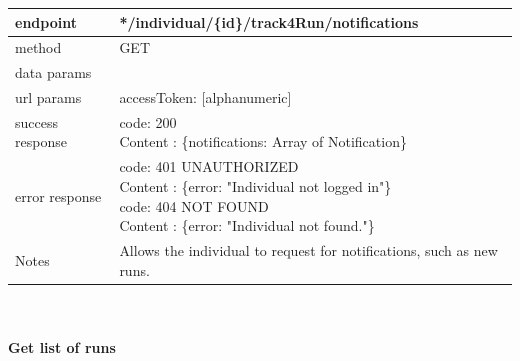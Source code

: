 \begin{legal}
\begin{legal}
\begin{itemize}
								\begin{tabularx}{\linewidth}{| l| l }
									\hline
									endpoint & */individual/\{id\}/track4Run/notifications \\
									\hline
									method & GET \\
									\hline
									data params & \\
									\hline
									url params &
									\parbox{0.7\textwidth}{
										\bigskip
										accessToken: [alphanumeric]
										\bigskip
									} \\
									\hline
									success response &
									\parbox{0.7\textwidth}{
										\bigskip
										code: 200\\
										Content : \{notifications: Array of Notification\}
										\bigskip
									} \\
									\hline
									error response &
									\parbox{0.7\textwidth}{
										\bigskip
										code: 401 UNAUTHORIZED \\
										Content : \{error: "Individual not logged in"\}\\
										code: 404 NOT FOUND \\
										Content : \{error: "Individual not found."\}
										\bigskip
									} \\
									\hline
									Notes & 
									\parbox{0.7\textwidth}{
										\bigskip Allows the individual to request for notifications, such as new runs.
									\bigskip}  \\
									\hline
								\end{tabularx}\\\\
								
								\textbf{Get list of runs} \\
			

\end{itemize}
\end{legal}
\end{legal}
